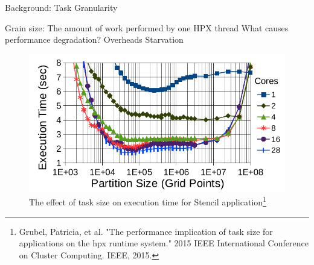 \documentclass[10pt]{beamer}
\begin{document}
%		

\begin{frame}{Background: Task Granularity}
	\begin{outline}
		Grain size: The amount of work performed by one HPX thread
		\1What causes performance degradation?
		\2Overheads
		\2Starvation
		\begin{figure}
			\centering
			\includegraphics[width=0.72\linewidth]{images/task_granularity.png}
			\caption{The effect of task size on execution time for Stencil application\footnote{Grubel, Patricia, et al. "The performance implication of task size for applications on the hpx runtime system." 2015 IEEE International Conference on Cluster Computing. IEEE, 2015.}}	
	
		\end{figure}
		
	\end{outline}
\end{frame}
\end{document}
